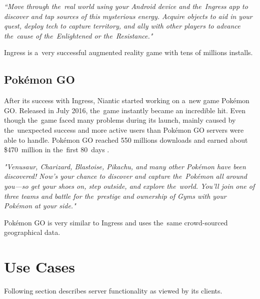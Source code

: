 	\textit{``Move through the~real world using your Android device and the~Ingress app to discover and tap sources of this mysterious energy. Acquire objects to aid in your quest, deploy tech to capture territory, and ally with other players to advance the~cause of the~Enlightened or the~Resistance."} \cite{ingress}
	
	Ingress is a~very successful augmented reality game with tens of millions installs.
	
	\subsection{Pokémon GO}
	After its success with Ingress, Niantic started working on a~new game Pokémon GO. Released in July 2016, the~game instantly became an incredible hit. Even though the~game faced many problems during its launch, mainly caused by the~unexpected success and more active users than Pokémon GO servers were able to handle. Pokémon GO reached 550 millions downloads and earned about \$470~million in the~first 80~days \cite{pokemongosuccess}.
	
	\textit{"Venusaur, Charizard, Blastoise, Pikachu, and many other Pokémon have been discovered! Now’s your chance to discover and capture the~Pokémon all around you—so get your shoes on, step outside, and explore the~world. You’ll join one of three teams and battle for the~prestige and ownership of Gyms with your Pokémon at your side."} \cite{pokemongo}
		
	Pokémon GO is very similar to Ingress and uses the~same crowd-sourced geographical data.
	
\section{Use Cases}
Following section describes server functionality as viewed by its clients.

